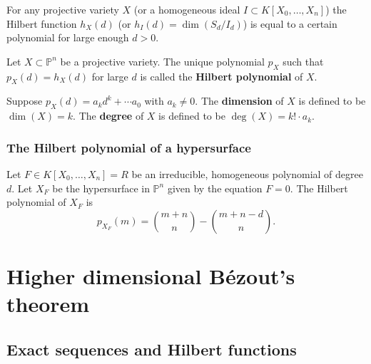 \documentclass[12pt, a4paper]{article}
\newcommand{\PP}{\mathbb P}
\begin{document}
\begin{mdthm}
    For any projective variety \(X\) (or a homogeneous ideal \(I \subset K[X_0,\ldots,X_n]\)) the Hilbert function \(h_X(d)\) (or \(h_I(d) = \dim(S_d/I_d)\)) is equal to a certain polynomial for large enough \(d>0\).
\end{mdthm}

\begin{definition}
    Let \(X \subset \PP^n\) be a projective variety. The unique polynomial \(p_X\) such that \(p_X(d) = h_X(d)\) for large \(d\) is called the \textbf{Hilbert polynomial} of \(X\). 
\end{definition}

\begin{definition}
    Suppose \(p_X(d)= a_k d^k +\cdots a_0\) with \(a_k \neq 0\). The \textbf{dimension} of \(X\) is defined to be \(\dim(X)=k\). The \textbf{degree} of \(X\) is defined to be \(\deg(X)=k! \cdot a_k\).
\end{definition}


\subsubsection{The Hilbert polynomial of a hypersurface}

\begin{mdlemma}
    Let \(F \in K[X_0,\ldots,X_n] = R\) be an irreducible, homogeneous polynomial of degree \(d\). Let \(X_F\) be the hypersurface in \(\PP^n\) given by the equation \(F=0\). The Hilbert polynomial of \(X_F\) is
    \[p_{X_F}(m) = \binom{m+n}{n}-\binom{m+n-d}{n}.\]
\end{mdlemma}

\section{Higher dimensional Bézout's theorem}

\subsection{Exact sequences and Hilbert functions}
\end{document}
